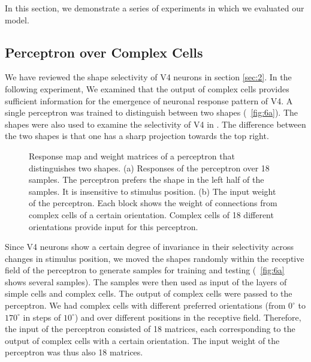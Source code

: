 \documentclass[conference]{IEEEtran}
\begin{document}
In this section, we demonstrate a series of experiments in which we evaluated our model.

\subsection{Perceptron over Complex Cells}

We have reviewed the shape selectivity of V4 neurons in section \ref{sec:2}.
In the following experiment, 
We examined that the output of complex cells provides sufficient information
for the emergence of neuronal response pattern of V4.
A single perceptron was trained to distinguish between two shapes (\figurename~\ref{fig:6a}).
The shapes were also used to examine the selectivity of V4 in \cite{pasupathy2001}.
The difference between the two shapes is that one has a sharp projection towards the top right.

\begin{figure}[htp]
\centering
{}\hfil
{}
\caption{Response map and weight matrices of a perceptron that distinguishes two shapes.
(a) Responses of the perceptron over 18 samples.
The perceptron prefers the shape in the left half of the samples.
It is insensitive to stimulus position.
(b) The input weight of the perceptron. 
Each block shows the weight of connections from complex cells of a certain orientation.
Complex cells of 18 different orientations provide input for this perceptron.}
\label{fig:6}
\end{figure}

Since V4 neurons show a certain degree of invariance in their selectivity across changes in stimulus position,
we moved the shapes randomly within the receptive field of the perceptron 
to generate samples for training and testing (\figurename~\ref{fig:6a} shows several samples).
The samples were then used as input of the layers of simple cells and complex cells.
The output of complex cells were passed to the perceptron.
We had complex cells with different preferred orientations 
(from $0^\circ$ to $170^\circ$ in steps of $10^\circ$) and over different positions in the receptive field.
Therefore, the input of the perceptron consisted of 18 matrices, 
each corresponding to the output of complex cells with a certain orientation.
The input weight of the perceptron was thus also 18 matrices.
\end{document}
